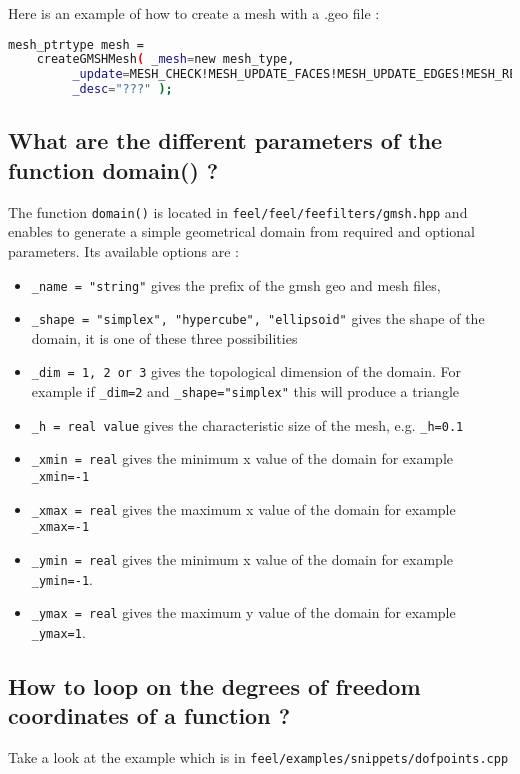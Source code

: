 Here is an example of how to create a mesh with a .geo file :
\begin{lstlisting}[language=sh]
 mesh_ptrtype mesh =
	createGMSHMesh( _mesh=new mesh_type,
         _update=MESH_CHECK!MESH_UPDATE_FACES!MESH_UPDATE_EDGES!MESH_RENUMBER,
         _desc="???" );
\end{lstlisting}


\subsection{What are the different parameters of the function domain() ?}
The function \lstinline!domain()! is located in \lstinline!feel/feel/feefilters/gmsh.hpp! and enables to generate a simple geometrical domain from required and optional parameters. Its available options are :
\begin{itemize}
\item \lstinline!_name = "string"! gives the prefix of the gmsh geo and mesh files,
\item \lstinline!_shape = "simplex", "hypercube", "ellipsoid"! gives the shape of the domain, it is one of these three possibilities
\item \lstinline!_dim = 1, 2 or 3! gives the topological dimension of the domain. For example if \lstinline!_dim=2! and \lstinline!_shape="simplex"! this will produce a triangle
\item \lstinline!_h = real value! gives the characteristic size of the mesh, e.g. \lstinline!_h=0.1!
\item \lstinline!_xmin = real! gives the minimum x value of the domain for example \lstinline!_xmin=-1!
\item \lstinline!_xmax = real! gives the maximum x value of the domain for example \lstinline!_xmax=-1!
\item \lstinline!_ymin = real! gives the minimum x value of the domain for example \lstinline!_ymin=-1!.
\item \lstinline!_ymax = real!  gives the maximum y value of the domain for example \lstinline!_ymax=1!.

\end{itemize}


\subsection{How to loop on the degrees of freedom coordinates of a function ?}

Take a look at the example which is in \lstinline!feel/examples/snippets/dofpoints.cpp!

